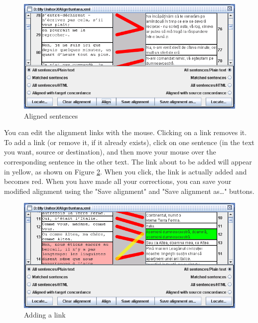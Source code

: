 \begin{figure}[!ht]
\begin{center}
\includegraphics[width=15.5cm]{resources/img/figX-4.png}
\caption{Aligned sentences\label{x-links}}
\end{center}
\end{figure}

\bigskip
\noindent You can edit the alignment links with the mouse. Clicking on a link
removes it. To add a link (or remove it, if it already exists), click on one
sentence (in the text you want, source or destination), and then move your mouse
over the corresponding sentence in the other text. The link about to be added
will appear in yellow, as shown on Figure \ref{x-adding-a-link}. When you click,
the link is actually added and becomes red. When you have made all your
corrections, you can save your modified alignment using the "Save alignment"
and "Save alignment as\ldots" buttons.

\begin{figure}[!ht]
\begin{center}
\includegraphics[width=15.5cm]{resources/img/figX-5.png}
\caption{Adding a link\label{x-adding-a-link}}
\end{center}
\end{figure}

